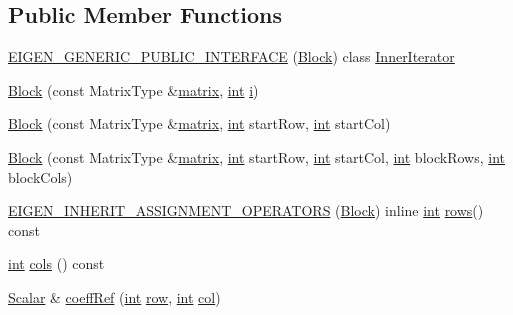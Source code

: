 \subsection*{Public Member Functions}
\begin{DoxyCompactItemize}
\item 
\hyperlink{class_block_aac1dc4e40e1c5f9c7e64f07471cf2ca3}{E\-I\-G\-E\-N\-\_\-\-G\-E\-N\-E\-R\-I\-C\-\_\-\-P\-U\-B\-L\-I\-C\-\_\-\-I\-N\-T\-E\-R\-F\-A\-C\-E} (\hyperlink{class_block}{Block}) class \hyperlink{class_inner_iterator}{Inner\-Iterator}
\item 
\hyperlink{class_block_ac58690e88b3aef34f8471cd376f2c438}{Block} (const Matrix\-Type \&\hyperlink{glext_8h_a7b24a3f2f56eb1244ae69dacb4fecb6f}{matrix}, \hyperlink{ioapi_8h_a787fa3cf048117ba7123753c1e74fcd6}{int} \hyperlink{uavobjecttemplate_8m_a6f6ccfcf58b31cb6412107d9d5281426}{i})
\item 
\hyperlink{class_block_ae221b76d6cae3edfdd10babf3ce036b1}{Block} (const Matrix\-Type \&\hyperlink{glext_8h_a7b24a3f2f56eb1244ae69dacb4fecb6f}{matrix}, \hyperlink{ioapi_8h_a787fa3cf048117ba7123753c1e74fcd6}{int} start\-Row, \hyperlink{ioapi_8h_a787fa3cf048117ba7123753c1e74fcd6}{int} start\-Col)
\item 
\hyperlink{class_block_ab9f696a132890ab79d04a9c585b7a6ac}{Block} (const Matrix\-Type \&\hyperlink{glext_8h_a7b24a3f2f56eb1244ae69dacb4fecb6f}{matrix}, \hyperlink{ioapi_8h_a787fa3cf048117ba7123753c1e74fcd6}{int} start\-Row, \hyperlink{ioapi_8h_a787fa3cf048117ba7123753c1e74fcd6}{int} start\-Col, \hyperlink{ioapi_8h_a787fa3cf048117ba7123753c1e74fcd6}{int} block\-Rows, \hyperlink{ioapi_8h_a787fa3cf048117ba7123753c1e74fcd6}{int} block\-Cols)
\item 
\hyperlink{class_block_a6255e69211641286e4c8207de1d816da}{E\-I\-G\-E\-N\-\_\-\-I\-N\-H\-E\-R\-I\-T\-\_\-\-A\-S\-S\-I\-G\-N\-M\-E\-N\-T\-\_\-\-O\-P\-E\-R\-A\-T\-O\-R\-S} (\hyperlink{class_block}{Block}) inline \hyperlink{ioapi_8h_a787fa3cf048117ba7123753c1e74fcd6}{int} \hyperlink{class_matrix_base_ae82810ba95da637cdf434b4274083723}{rows}() const 
\item 
\hyperlink{ioapi_8h_a787fa3cf048117ba7123753c1e74fcd6}{int} \hyperlink{class_block_a2aae0c49d70a46d828f374c3200eb933}{cols} () const 
\item 
\hyperlink{class_matrix_base_a625df8339dc2d816cbc0fd66e7dadaf5}{Scalar} \& \hyperlink{class_block_a37bd1390677199b302d1330f5699e910}{coeff\-Ref} (\hyperlink{ioapi_8h_a787fa3cf048117ba7123753c1e74fcd6}{int} \hyperlink{glext_8h_a11b277b422822f784ee248b43eee3e1e}{row}, \hyperlink{ioapi_8h_a787fa3cf048117ba7123753c1e74fcd6}{int} \hyperlink{class_matrix_base_ae3c94b0f25b4273c7a8125169bdf60e0}{col})

\end{DoxyCompactItemize}
